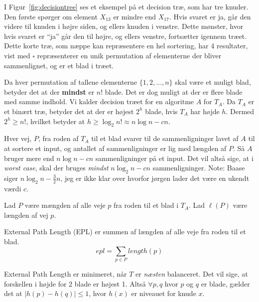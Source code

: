 I Figur~\ref{fig:decisiontree} ses et eksempel på et decision træ, som har tre knuder. Den første spørger om element $X_{13}$ er mindre end $X_{17}$. Hvis svaret er ja, går den videre til knuden i højre siden, og ellers knuden i venstre. Dette mønster, hvor hvis svaret er ``ja'' går den til højre, og ellers venstre, fortsætter igennem træet. Dette korte træ, som næppe kan repræsentere en hel sortering, har 4 resultater, vist med $\square$ repræsenterer en unik permutation af elementerne der bliver sammenlignet, og er et blad i træet.

Da hver permutation af tallene elementerne $\{1, 2, \ldots, n\}$ skal være et muligt blad, betyder det at der \textbf{mindst} er $n!$ blade. Det er dog muligt at der er flere blade med samme indhold. Vi kalder decision træet for en algoritme $A$ for $T_{A}$. Da $T_{A}$ er et binært træ, betyder det at der er højest $2^{h}$ blade, hvis $T_{A}$ har højde $h$. Dermed $2^{h} \ge n!$, hvilket betyder at $h \ge \log_{2}n! \approx n \log n - cn$.

Hver vej, $P$, fra roden af $T_{A}$ til et blad svarer til de sammenligninger lavet af $A$ til at sortere et input, og antallet af sammenligninger er lig med længden af $P$. Så $A$ bruger mere end $n \log n - cn$ sammenligninger på et input. Det vil altså sige, at i \textit{worst case}, skal der bruges \textit{mindst} $n \log_{2} n - cn$ sammenligninger. Note: Baase siger $n \log_{2} n - \frac{3}{2}n$, jeg er ikke klar over hvorfor jørgen lader det være en ukendt værdi $c$.

Lad $P$ være mængden af alle veje $p$ fra roden til et blad i $T_{A}$. Lad $\ell(P)$ være længden af vej $p$.

\begin{definition}
  External Path Length (EPL) er summen af længden af alle veje fra roden til et blad.
  \begin{equation}
	epl = \sum_{p \in P} \mathit{length}(p)
  \end{equation}
\end{definition}

\begin{lemma}
External Path Length er minimeret, når $T$ er \textit{næsten} balanceret. Det vil sige, at forskellen i højde for 2 blade er højest 1. Altså $\forall p,q$ hvor $p$ og $q$ er blade, gælder det at $|h(p) - h(q)| \le 1$, hvor $h(x)$ er niveauet for knude $x$.
\end{lemma}

